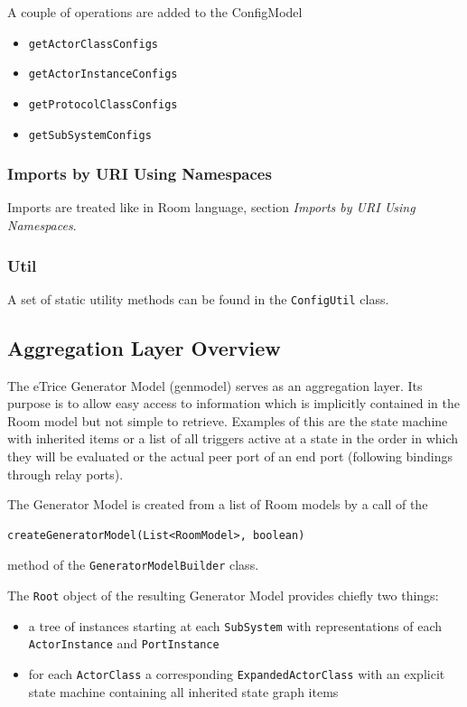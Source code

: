 A couple of operations are added to the ConfigModel
\begin{itemize}
\item \texttt{getActorClassConfigs}
\item \texttt{getActorInstanceConfigs}
\item \texttt{getProtocolClassConfigs}
\item \texttt{getSubSystemConfigs}
\end{itemize}

\subsubsection{Imports by URI Using Namespaces}

Imports are treated like in Room language, section \textit{Imports by URI Using Namespaces}.

\subsubsection{Util}

A set of static utility methods can be found in the \texttt{ConfigUtil} class.

\subsection{Aggregation Layer Overview}

The eTrice Generator Model (genmodel) serves as an aggregation layer. Its purpose is to allow easy access 
to information which is implicitly contained in the Room model but not simple to retrieve.
Examples of this are the state machine with inherited items or a list of all triggers active at a state in 
the order in which they will be evaluated or the actual peer port of an end port (following bindings 
through relay ports).

The Generator Model is created from a list of Room models by a call of the

\begin{verbatim}createGeneratorModel(List<RoomModel>, boolean)\end{verbatim}

method of the \texttt{GeneratorModelBuilder} class.

The \texttt{Root} object of the resulting Generator Model provides chiefly two things:
\begin{itemize}
\item a tree of instances starting at each \texttt{SubSystem} with representations of each 
\texttt{ActorInstance} and \texttt{PortInstance}
\item for each \texttt{ActorClass} a corresponding \texttt{ExpandedActorClass} with an explicit state 
machine containing all inherited state graph items
\end{itemize}

